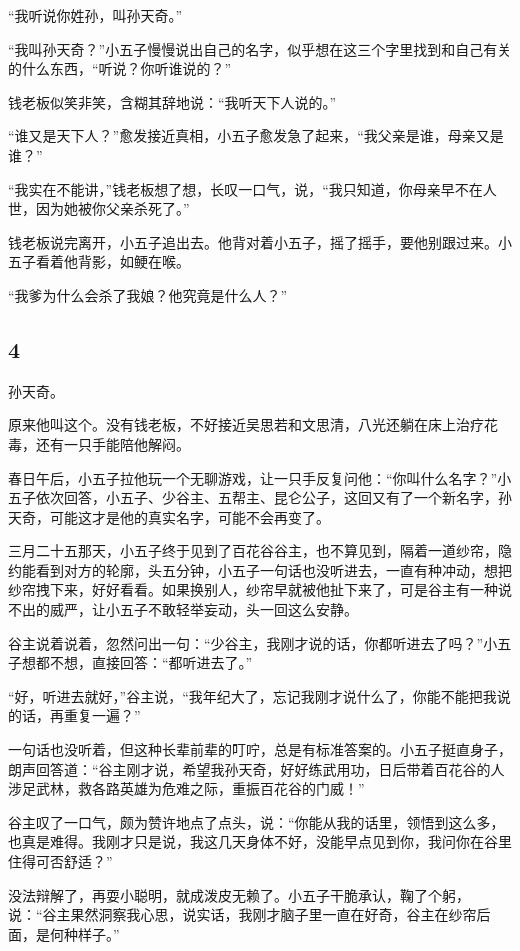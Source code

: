“我听说你姓孙，叫孙天奇。”

“我叫孙天奇？”小五子慢慢说出自己的名字，似乎想在这三个字里找到和自己有关的什么东西，“听说？你听谁说的？”

钱老板似笑非笑，含糊其辞地说：“我听天下人说的。”

“谁又是天下人？”愈发接近真相，小五子愈发急了起来，“我父亲是谁，母亲又是谁？”

“我实在不能讲，”钱老板想了想，长叹一口气，说，“我只知道，你母亲早不在人世，因为她被你父亲杀死了。”

钱老板说完离开，小五子追出去。他背对着小五子，摇了摇手，要他别跟过来。小五子看着他背影，如鲠在喉。

“我爹为什么会杀了我娘？他究竟是什么人？”
\newline

{\centering\subsection{4}}

孙天奇。

原来他叫这个。没有钱老板，不好接近吴思若和文思清，八光还躺在床上治疗花毒，还有一只手能陪他解闷。

春日午后，小五子拉他玩一个无聊游戏，让一只手反复问他：“你叫什么名字？”小五子依次回答，小五子、少谷主、五帮主、昆仑公子，这回又有了一个新名字，孙天奇，可能这才是他的真实名字，可能不会再变了。

三月二十五那天，小五子终于见到了百花谷谷主，也不算见到，隔着一道纱帘，隐约能看到对方的轮廓，头五分钟，小五子一句话也没听进去，一直有种冲动，想把纱帘拽下来，好好看看。如果换别人，纱帘早就被他扯下来了，可是谷主有一种说不出的威严，让小五子不敢轻举妄动，头一回这么安静。

谷主说着说着，忽然问出一句：“少谷主，我刚才说的话，你都听进去了吗？”小五子想都不想，直接回答：“都听进去了。”

“好，听进去就好，”谷主说，“我年纪大了，忘记我刚才说什么了，你能不能把我说的话，再重复一遍？”

一句话也没听着，但这种长辈前辈的叮咛，总是有标准答案的。小五子挺直身子，朗声回答道：“谷主刚才说，希望我孙天奇，好好练武用功，日后带着百花谷的人涉足武林，救各路英雄为危难之际，重振百花谷的门威！”

谷主叹了一口气，颇为赞许地点了点头，说：“你能从我的话里，领悟到这么多，也真是难得。我刚才只是说，我这几天身体不好，没能早点见到你，我问你在谷里住得可否舒适？”

没法辩解了，再耍小聪明，就成泼皮无赖了。小五子干脆承认，鞠了个躬，说：“谷主果然洞察我心思，说实话，我刚才脑子里一直在好奇，谷主在纱帘后面，是何种样子。”

